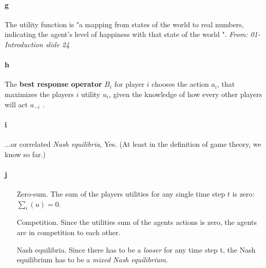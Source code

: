 \paragraph{g}
\label{Utility function}
	The utility function is "a mapping from states of the world to real numbers, indicating the agent's level of happiness with that state of the world ".
	\textit{From: 01-Introduction slide 24}
\paragraph{h}
\label{Best Response Operator}
	The \textbf{best response operator} $B_i$ for player $i$ chooses the action $a_i$, that maximizes the players $i$ utility $u_i$, given the knowledge of how every other players will act $a_{-i}$ .
\paragraph{i}
\label{Nash Equilibria}
	...or correlated \textit{Nash equilibria}, Yes. (At least in the definition of game theory, we know so far.)
\paragraph{j}
\label{Zero-sum games}
	\begin{enumerate}
		\item[Zero-sum.] The sum of the players utilities  for any single time step $t$ is zero:  $\sum_i(u) = 0$.
		\item[Competition.] Since the utilities sum of the agents actions is zero, the agents are in competition to each other.
		\item[Nash equilibria.] Since there has to be a \textit{looser} for any time step t, the Nash equilibrium has to be a \textit{mixed Nash equilibrium}.
		
	\end{enumerate}

%
